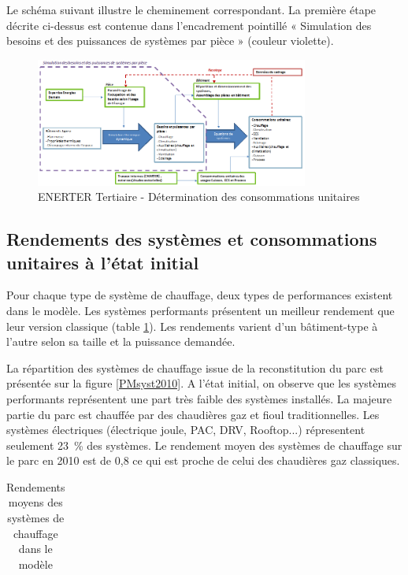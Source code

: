 \documentclass[10.5pt,a4paper]{article}
\begin{document}
{Le schéma suivant illustre le cheminement correspondant. La première étape décrite ci-dessus est contenue dans l’encadrement pointillé « Simulation des besoins et des puissances de systèmes par pièce » (couleur violette).

\begin{figure}[ht]
\centering
\caption{ENERTER Tertiaire - Détermination des consommations unitaires}\label{Schema_calcul_conso}
\includegraphics[width = 0.8\textwidth]{Schema_calcul_conso}
\end{figure}

\newpage
\clearpage


\subsection{Rendements des systèmes et consommations unitaires à l'état initial}

Pour chaque type de système de chauffage, deux types de performances existent dans le modèle. Les systèmes performants présentent un meilleur rendement que leur version classique (table \ref{Rdtsyst}). Les rendements varient d'un bâtiment-type à l'autre selon sa taille et la puissance demandée. 
 
La répartition des systèmes de chauffage issue de la reconstitution du parc est présentée sur la figure \ref{PMsyst2010}.  A l’état initial, on observe que les systèmes performants représentent une part très faible des systèmes installés. La majeure partie du parc est chauffée par des chaudières gaz et fioul traditionnelles. Les systèmes électriques (électrique joule, PAC, DRV, Rooftop...) répresentent seulement 23~\% des systèmes. Le rendement moyen des systèmes de chauffage sur le parc en 2010 est de 0,8 ce qui est proche de celui des chaudières gaz classiques. 
 
\begin{table}[ht]
\caption{Rendements moyens des systèmes de chauffage dans le modèle}
\label{Rdtsyst}
\begin{center}
\begin{tabular}{l|c}


\end{tabular}
\end{center}
\end{table}}
\end{document}
